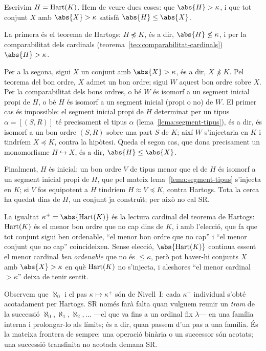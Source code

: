 \begin{prova}
Escrivim \(H=\operatorname{Hart}(K)\). Hem de veure dues coses: que \(\abs{H}>\kappa\), i que
tot conjunt \(X\) amb \(\abs{X}>\kappa\) satisfà \(\abs{H}\le\abs{X}\).

La primera és el teorema de Hartogs: \(H\not\preceq K\), és a dir,
\(\abs{H}\not\le\kappa\), i per la comparabilitat dels cardinals
(teorema~\ref{teo:comparabilitat-cardinals}) \(\abs{H}>\kappa\).

Per a la segona, sigui \(X\) un conjunt amb \(\abs{X}>\kappa\), és a dir,
\(X\not\preceq K\). Pel teorema del bon ordre, \(X\) admet un bon ordre; sigui
\(W\) aquest bon ordre sobre \(X\). Per la comparabilitat dels bons ordres,
o bé \(W\) és isomorf a un segment inicial propi de \(H\), o bé \(H\) és
isomorf a un segment inicial (propi o no) de \(W\). El primer cas és impossible:
el segment inicial propi de \(H\) determinat per un tipus \(\alpha=[(S,R)]\) té
precisament el tipus \(\alpha\) (lema~\ref{lema:segment-tipus}), és a dir, és
isomorf a un bon ordre \((S,R)\) sobre una part \(S\) de \(K\); així \(W\)
s'injectaria en \(K\) i tindríem \(X\preceq K\), contra la hipòtesi. Queda el segon cas, que dona
precisament un monomorfisme \(H\hookrightarrow X\), és a dir, \(\abs{H}\le\abs{X}\).

Finalment, \(H\) és inicial: un bon ordre \(V\) de tipus menor que el de
\(H\) és isomorf a un segment inicial propi de \(H\), que pel mateix
lema~\ref{lema:segment-tipus} s'injecta en \(K\); si \(V\) fos equipotent a
\(H\) tindríem \(H\approx V\preceq K\), contra Hartogs. Tota la cerca ha quedat dins de \(H\), un conjunt ja construït;
per això no cal SR.
\end{prova}

\begin{observacio}\label{obs:successor-hartogs}
La igualtat \(\kappa^{+}=\abs{\Hart(K)}\) és la lectura cardinal del teorema de
Hartogs: \(\operatorname{Hart}(K)\) és el menor bon ordre que no cap dins de \(K\), i amb
l'elecció, que fa que tot conjunt sigui ben ordenable, \enquote{el menor bon
ordre que no cap} i \enquote{el menor conjunt que no cap} coincideixen. Sense
elecció, \(\abs{\Hart(K)}\) continua essent el menor cardinal \emph{ben
ordenable} que no és \(\le\kappa\), però pot haver-hi conjunts \(X\) amb
\(\abs{X}>\kappa\) en què \(\operatorname{Hart}(K)\) no s'injecta, i aleshores
\enquote{el menor cardinal \(>\kappa\)} deixa de tenir sentit.
\end{observacio}

\begin{observacio}\label{obs:successor-sense-sr}
Observem que \(\aleph_0\) i el pas \(\kappa\mapsto\kappa^{+}\) són de
Nivell~I: cada \(\kappa^{+}\) individual s'obté acotadament per Hartogs. SR
només farà falta quan vulguem reunir un \emph{tram} de la successió
\(\aleph_0,\aleph_1,\aleph_2,\dots\) ---el que va fins a un ordinal fix
\(\lambda\)--- en una família interna i prolongar-lo als límits; és a dir,
quan passem d'un pas a una família. És la mateixa frontera de sempre: una
operació binària o un successor són acotats; una successió transfinita no
acotada demana SR.
\end{observacio}

